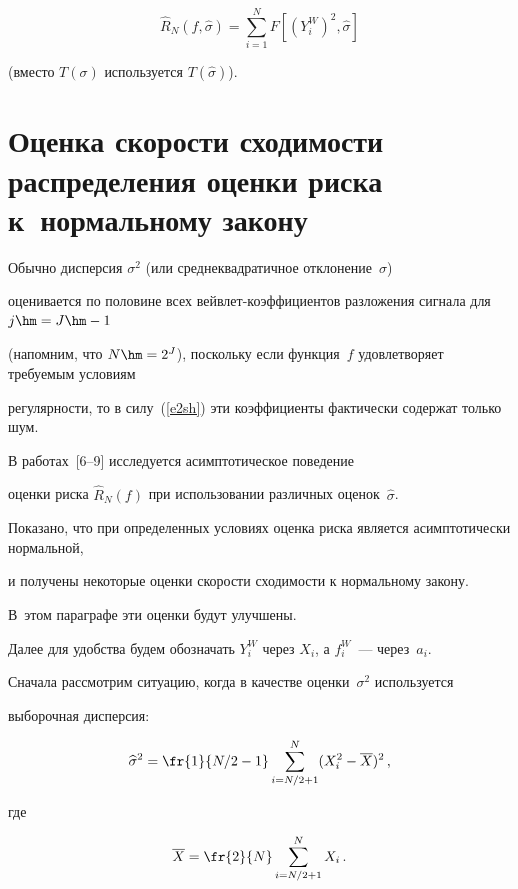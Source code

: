 \begin{equation*}

\widehat{R}_N(f,\widehat{\sigma})=\sum\limits_{i=1}^{N}F\left[(Y_i^W)^2,\widehat{\sigma}\right]


\end{equation*}

(вместо $T(\sigma)$ используется $T(\hat{\sigma})$).



\section{Оценка скорости сходимости распределения оценки риска к~нормальному закону}



Обычно дисперсия $\sigma^2$ (или среднеквадратичное отклонение~$\sigma$) 

оценивается по половине всех вейвлет-коэффициентов разложения сигнала для $j\hm=J\hm-1$ 

(напомним, что $N\hm=2^J$), поскольку если функция~$f$ удовлетворяет требуемым условиям 

регулярности, то в силу~(\ref{e2sh}) эти коэффициенты фактически содержат только шум.



В работах~[6--9] исследуется асимптотическое поведение 

оценки риска $\widehat{R}_N(f)$ при использовании различных оценок~$\hat{\sigma}$. 

Показано, что при определенных условиях оценка риска является асимптотически нормальной, 

и получены некоторые оценки скорости сходимости к нормальному закону. 

В~этом параграфе эти оценки будут улучшены.



Далее для удобства будем обозначать $Y_i^W$ через $X_i$, а $f_i^W$~--- через~$a_i$. 

Сначала рассмотрим ситуацию, когда в качестве оценки~$\sigma^2$ используется 

выборочная дисперсия:

$$

\widehat{\sigma}^2=\fr{1}{N/2-1}\sum\limits_{i=N/2+1}^{N}(X^2_i-\overline{X})^2\,,

$$

где

\begin{equation}

\overline{X}=\fr{2}{N}\sum\limits_{i=N/2+1}^{N}X_i\,.\label{e6sh}

\end{equation}



